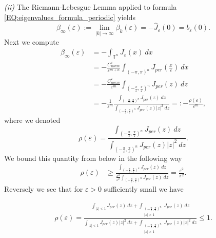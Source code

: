 \documentclass[12pt, a4paper]{article}
\theoremstyle{break}
\theoremstyle{break}
\theoremstyle{break}
\theoremstyle{break}
\theoremstyle{break}
\begin{document}
\textit{(ii)} The Riemann-Lebesgue Lemma applied to formula \eqref{EQ:eigenvalues_formula_periodic} yields
\begin{equation*}
    \beta_\infty(\varepsilon) := \lim_{|k| \rightarrow \infty} \beta_k(\varepsilon) = -\hat{J}_\varepsilon(0) = b_\varepsilon(0).
\end{equation*}
Next we compute
\begin{align*}
    \beta_\infty(\varepsilon) &= 
    - \int_{\mathbb{T}^n} J_\varepsilon(x)\:dx \\
    &= -\frac{C_{norm}^\varepsilon}{\varepsilon^{m+n}} \int_{\left(-\pi, \pi\right)^n} J_{per}\left(\frac{x}{\varepsilon}\right)\:dx \\
    &= -\frac{C_{norm}^\varepsilon}{\varepsilon^{m}} \int_{\left(-\frac{\pi}{\varepsilon}, \frac{\pi}{\varepsilon}\right)^n} J_{per}\left(z\right)\:dz \\
    &= -\frac{1}{\varepsilon^m} \frac{\int_{\left(-\frac{\pi}{\varepsilon}, \frac{\pi}{\varepsilon}\right)^n} J_{per}\left(z\right)\:dz}{\int_{\left(-\frac{\pi}{\varepsilon}, \frac{\pi}{\varepsilon}\right)^n} J_{per}\left(z \right)|z|^2\:dz} =: -\frac{\rho(\varepsilon)}{\varepsilon^m},
\end{align*}
where we denoted
\begin{equation*}
    \rho(\varepsilon) = \frac{\int_{\left(-\frac{\pi}{\varepsilon}, \frac{\pi}{\varepsilon}\right)^n} J_{per}\left(z\right)\:dz}{\int_{\left(-\frac{\pi}{\varepsilon}, \frac{\pi}{\varepsilon}\right)^n} J_{per}\left(z \right)|z|^2\:dz}.
\end{equation*}
We bound this quantity from below in the following way
\begin{align*}
    \rho(\varepsilon) &\geq \frac{\int_{\left(-\frac{\pi}{\varepsilon}, \frac{\pi}{\varepsilon}\right)^n} J_{per}\left(z\right)\:dz}{\frac{\pi^2}{\varepsilon^2}\int_{\left(-\frac{\pi}{\varepsilon}, \frac{\pi}{\varepsilon}\right)^n} J_{per}(z)\:dz} = \frac{\varepsilon^2}{\pi^2}.
\end{align*}
Reversely we see that for $\varepsilon > 0$ sufficiently small we have

\begin{align*}
    \rho(\varepsilon) = \frac{
    \int_{|z| < 1} J_{per}\left(z\right)\:dz + 
    \int_{\substack{\left(-\frac{\pi}{\varepsilon}, \frac{\pi}{\varepsilon}\right)^n \\ |z| > 1}} J_{per}\left(z\right)\:dz
    }{
        \int_{|z| < 1} J_{per} \left(z\right)|z|^2\:dz + 
    \int_{\substack{\left(-\frac{\pi}{\varepsilon}, \frac{\pi}{\varepsilon}\right)^n \\ |z| > 1}} J_{per}\left(z\right)|z|^2\:dz
    } \leq 1.
\end{align*}
\end{document}
